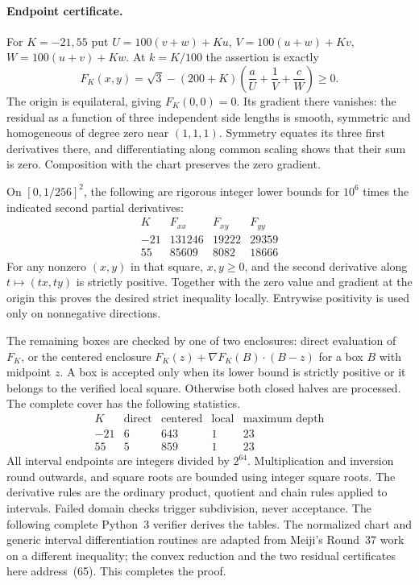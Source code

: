 \documentclass[11pt,a4paper]{article}
\numberwithin{equation}{section}
\theoremstyle{definition}
\theoremstyle{remark}
\begin{document}
\paragraph{Endpoint certificate.}
For $K=-21,55$ put $U=100(v+w)+Ku$, $V=100(u+w)+Kv$, $W=100(u+v)+Kw$. At $k=K/100$ the assertion is exactly
\[
 F_K(x,y)=\sqrt3-(200+K)\left(\frac aU+\frac1V+\frac cW\right)\ge0.
\]
The origin is equilateral, giving $F_K(0,0)=0$. Its gradient there vanishes: the residual as a function of three independent side lengths is smooth, symmetric and homogeneous of degree zero near $(1,1,1)$. Symmetry equates its three first derivatives there, and differentiating along common scaling shows that their sum is zero. Composition with the chart preserves the zero gradient.

On $[0,1/256]^2$, the following are rigorous integer lower bounds for $10^6$ times the indicated second partial derivatives:
\[
 \begin{array}{r|rrr}
 K&F_{xx}&F_{xy}&F_{yy}\\\hline
 -21&131246&19222&29359\\
 55&85609&8082&18666
 \end{array}
\]
For any nonzero $(x,y)$ in that square, $x,y\ge0$, and the second derivative along $t\mapsto(tx,ty)$ is strictly positive. Together with the zero value and gradient at the origin this proves the desired strict inequality locally. Entrywise positivity is used only on nonnegative directions.

The remaining boxes are checked by one of two enclosures: direct evaluation of $F_K$, or the centered enclosure $F_K(z)+\nabla F_K(B)\cdot(B-z)$ for a box $B$ with midpoint $z$. A box is accepted only when its lower bound is strictly positive or it belongs to the verified local square. Otherwise both closed halves are processed. The complete cover has the following statistics.
\[
\begin{array}{r|rrr|r}
 K& \text{direct}&\text{centered}&\text{local}&\text{maximum depth}\\\hline
 -21&6&643&1&23\\
 55&5&859&1&23
\end{array}
\]
All interval endpoints are integers divided by $2^{64}$. Multiplication and inversion round outwards, and square roots are bounded using integer square roots. The derivative rules are the ordinary product, quotient and chain rules applied to intervals. Failed domain checks trigger subdivision, never acceptance. The following complete Python~3 verifier derives the tables. The normalized chart and generic interval differentiation routines are adapted from Meiji's Round~37 work on a different inequality; the convex reduction and the two residual certificates here address~(65). This completes the proof.
\end{document}
